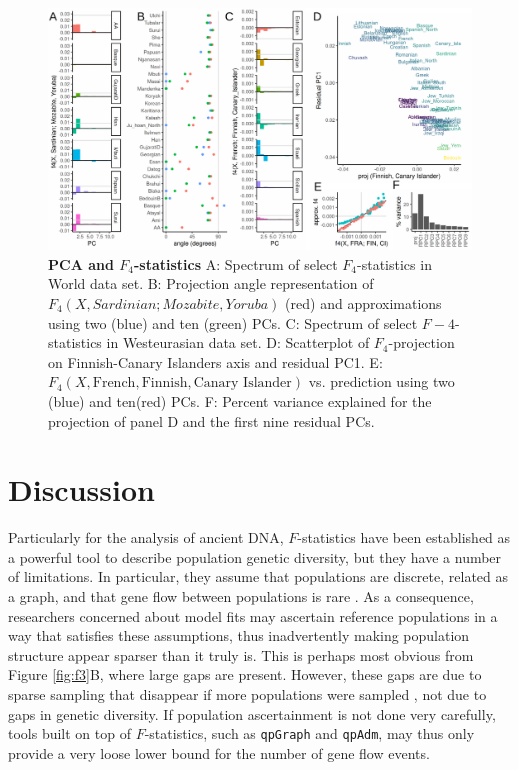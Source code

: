 \documentclass[12pt,a4pape, fullpage]{article}
\begin{document}
\begin{figure}[!ht]
\includegraphics[width=\textwidth]{figures/fig_f4_data.pdf}	
	\caption{\textbf{PCA and $F_4$-statistics} A: Spectrum of select $F_4$-statistics in World data set. B: Projection angle representation of $F_4(X, Sardinian; Mozabite, Yoruba)$ (red) and approximations using two (blue) and ten (green) PCs. C: Spectrum of select $F-4$-statistics in Westeurasian data set. D: Scatterplot of $F_4$-projection on Finnish-Canary Islanders axis and residual PC1.
	E: $F_4(X, \text{French}, \text{Finnish}, \text{Canary Islander})$ vs. prediction using two (blue) and ten(red) PCs. F: Percent variance explained for the projection of panel D and the first nine residual PCs.
	}
\label{fig:f4}
\end{figure}

\section{Discussion}
Particularly for the analysis of ancient DNA, $F$-statistics have been established as a powerful tool to describe population genetic diversity, but they have a number of limitations. In particular, they assume that populations are discrete, related as a graph, and that gene flow between populations is rare \citep{patterson2012,harney2021}. As a consequence, researchers concerned about model fits may ascertain reference populations in a way that satisfies these assumptions, thus inadvertently making population structure appear sparser than it truly is. This is perhaps most obvious from Figure \ref{fig:f3}B, where large gaps are present. However, these gaps are due to sparse sampling that disappear if more populations were sampled \citep[e.g.][]{peter2020a}, not due to gaps in genetic diversity. If population ascertainment is not done very carefully, tools built on top of $F$-statistics, such as \texttt{qpGraph} and \texttt{qpAdm}, may thus only provide a very loose lower bound for the number of gene flow events.
\end{document}

